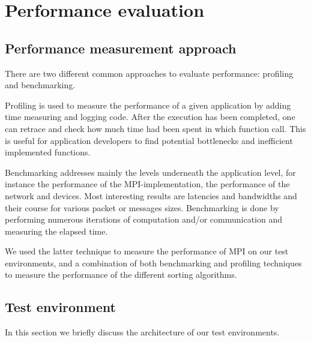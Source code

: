 \section{Performance evaluation}

\subsection{Performance measurement approach}
\label{test-env}
There are two different common approaches to evaluate performance: profiling and benchmarking.

Profiling is used to measure the performance of a given application by adding time measuring and logging code. After the execution has been completed, one can retrace and check how much time had been spent in which function call. This is useful for application developers to find potential bottlenecks and inefficient implemented functions.

Benchmarking addresses mainly the levels underneath the application level, for instance the performance
of the MPI-implementation, the performance of the network and devices. Most interesting results are latencies and bandwidths and their course for various packet or messages sizes. Benchmarking is done by performing numerous iterations of computation and/or communication and measuring the elapsed time.

We used the latter technique to measure the performance of MPI on our test environments, and a combination of both benchmarking and profiling techniques to measure the performance of the different sorting algorithms.

\subsection{Test environment}
In this section we briefly discuss the architecture of our test environments. 

